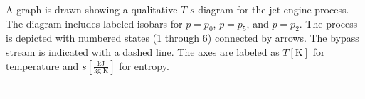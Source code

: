 A graph is drawn showing a qualitative \( T \)-\( s \) diagram for the jet engine process. The diagram includes labeled isobars for \( p = p_0 \), \( p = p_5 \), and \( p = p_2 \). The process is depicted with numbered states (1 through 6) connected by arrows. The bypass stream is indicated with a dashed line. The axes are labeled as \( T[\text{K}] \) for temperature and \( s[\frac{\text{kJ}}{\text{kg·K}}] \) for entropy.

---